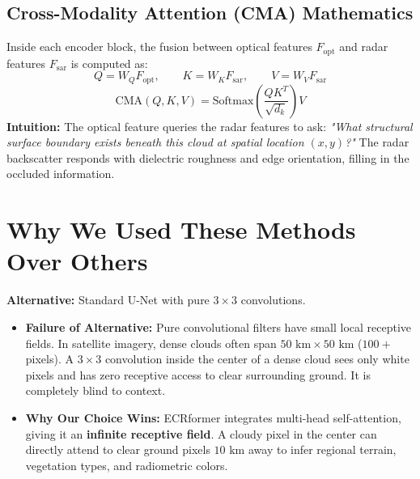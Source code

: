 \documentclass[11pt,a4paper]{article}
\begin{document}
\subsection{Cross-Modality Attention (CMA) Mathematics}

Inside each encoder block, the fusion between optical features $F_{\text{opt}}$ and radar features $F_{\text{sar}}$ is computed as:
\begin{equation}
Q = W_Q F_{\text{opt}}, \qquad K = W_K F_{\text{sar}}, \qquad V = W_V F_{\text{sar}}
\end{equation}
\begin{equation}
\text{CMA}(Q, K, V) = \text{Softmax}\left( \frac{Q K^T}{\sqrt{d_k}} \right) V
\end{equation}
\textbf{Intuition:} The optical feature queries the radar features to ask: \textit{"What structural surface boundary exists beneath this cloud at spatial location $(x, y)$?"} The radar backscatter responds with dielectric roughness and edge orientation, filling in the occluded information.

\section{Why We Used These Methods Over Others}

\begin{tcolorbox}[colback=white,colframe=primary,title=\textbf{1. Why ECRformer over Standard Convolutional U-Nets (e.g. Pix2Pix, DSen2-CR)?}]
\textbf{Alternative:} Standard U-Net with pure $3 \times 3$ convolutions.
\begin{itemize}[leftmargin=1.2em, itemsep=0.2em]
    \item \textbf{Failure of Alternative:} Pure convolutional filters have small local receptive fields. In satellite imagery, dense clouds often span $50\text{ km} \times 50\text{ km}$ ($100+$ pixels). A $3 \times 3$ convolution inside the center of a dense cloud sees only white pixels and has zero receptive access to clear surrounding ground. It is completely blind to context.
    \item \textbf{Why Our Choice Wins:} ECRformer integrates multi-head self-attention, giving it an \textbf{infinite receptive field}. A cloudy pixel in the center can directly attend to clear ground pixels $10\text{ km}$ away to infer regional terrain, vegetation types, and radiometric colors.
\end{itemize}
\end{tcolorbox}
\end{document}
